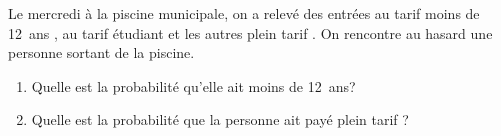  \begin{exercice}
     Le mercredi à la piscine municipale, on a relevé  des entrées au  
 \og tarif moins de 12~ans \fg,  au \og tarif étudiant \fg et les autres
 \og plein
     tarif \fg{}. On rencontre au hasard une personne sortant de la piscine.
         \begin{enumerate}
             \item Quelle est la probabilité qu'elle ait moins de 12~ans?
             \item Quelle est la probabilité que la personne ait payé \og plein 
 tarif \fg{}?
         \end{enumerate}
 \end{exercice}
 
